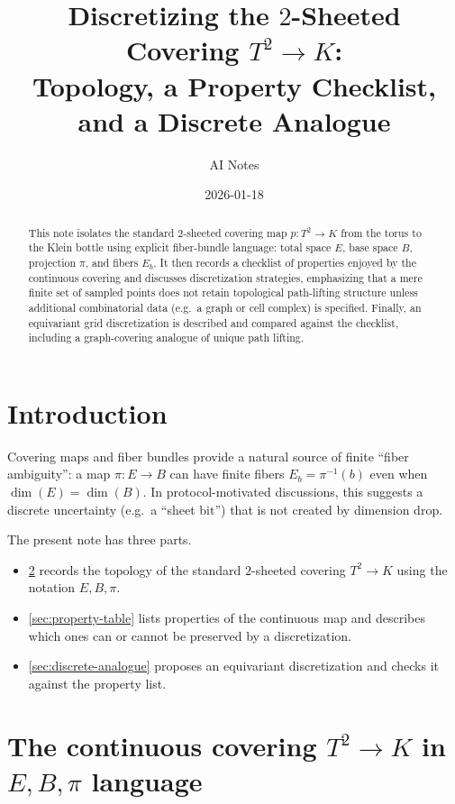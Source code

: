 \documentclass[11pt,a4paper]{article}
\title{Discretizing the \(2\)-Sheeted Covering \(T^2\to K\):\\
Topology, a Property Checklist, and a Discrete Analogue}
\author{AI Notes}
\date{2026-01-18}
\theoremstyle{definition}
\theoremstyle{remark}
\begin{document}
\maketitle

\begin{abstract}
This note isolates the standard \(2\)-sheeted covering map \(p:T^2\to K\) from the torus to the Klein bottle using explicit fiber-bundle language: total space \(E\), base space \(B\), projection \(\pi\), and fibers \(E_b\). It then records a checklist of properties enjoyed by the continuous covering and discusses discretization strategies, emphasizing that a mere finite set of sampled points does not retain topological path-lifting structure unless additional combinatorial data (e.g.\ a graph or cell complex) is specified. Finally, an equivariant grid discretization is described and compared against the checklist, including a graph-covering analogue of unique path lifting.
\end{abstract}

\section{Introduction}
\label{sec:introduction}

Covering maps and fiber bundles provide a natural source of finite ``fiber ambiguity'': a map \(\pi:E\to B\) can have finite fibers \(E_b=\pi^{-1}(b)\) even when \(\dim(E)=\dim(B)\). In protocol-motivated discussions, this suggests a discrete uncertainty (e.g.\ a ``sheet bit'') that is not created by dimension drop.

The present note has three parts.
\begin{itemize}
  \item \cref{sec:continuous} records the topology of the standard \(2\)-sheeted covering \(T^2\to K\) using the notation \(E,B,\pi\).
  \item \cref{sec:property-table} lists properties of the continuous map and describes which ones can or cannot be preserved by a discretization.
  \item \cref{sec:discrete-analogue} proposes an equivariant discretization and checks it against the property list.
\end{itemize}

\section{The continuous covering \(T^2\to K\) in \(E,B,\pi\) language}
\label{sec:continuous}
\end{document}
